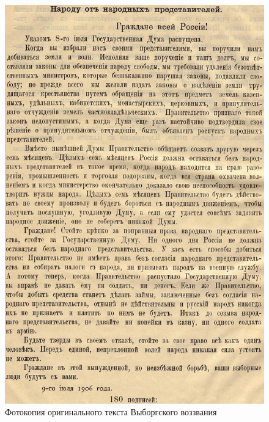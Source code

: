 \begin{figure}[h!tb] 
	\centering\includegraphics[scale=0.5]{Vozzvanie/MrEBj2VUCCs.jpg}
	\caption{Фотокопия оригинального текста Выборгского воззвания}%
\end{figure}

